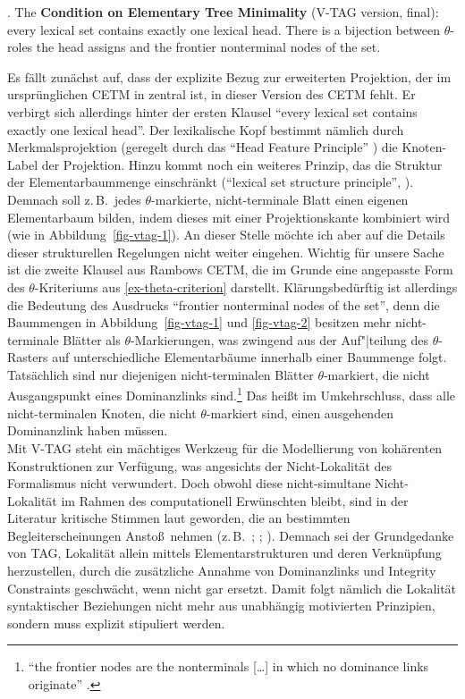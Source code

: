 \ex. The {\bf Condition on Elementary Tree Minimality} (V-TAG version, final): every lexical set contains exactly one lexical head. There is a bijection between $\theta$-roles the head assigns and the frontier nonterminal nodes of the set. \citep[149]{Rambow:94} \label{ex-vtag-cetm}

Es fällt zunächst auf, dass der explizite Bezug zur erweiterten Projektion, der im ursprünglichen CETM in \cite{Frank:92,Frank:02} zentral ist, in dieser Version des CETM fehlt. Er verbirgt sich allerdings hinter der ersten Klausel "`every lexical set contains exactly one lexical head"'. Der lexikalische Kopf bestimmt nämlich durch Merkmalsprojektion (geregelt durch das "`Head Feature Principle"' \citep[141f]{Rambow:94}) die Knoten-Label der Projektion. Hinzu kommt noch ein weiteres Prinzip, das die Struktur der Elementarbaummenge einschränkt ("`lexical set structure principle"', \citealt[149]{Rambow:94}). Demnach soll z.\,B.\ jedes $\theta$-markierte, nicht-terminale Blatt einen eigenen Elementarbaum bilden, indem dieses mit einer Projektionskante kombiniert wird (wie in Abbildung~\ref{fig-vtag-1}). An dieser Stelle möchte ich aber auf die Details dieser strukturellen Regelungen nicht weiter eingehen. Wichtig für unsere Sache ist die zweite Klausel aus Rambows CETM, die im Grunde eine angepasste Form des $\theta$-Kriteriums aus \ref{ex-theta-criterion} darstellt. Klärungsbedürftig ist allerdings die Bedeutung des Ausdrucks "`frontier nonterminal nodes of the set"', denn die Baummengen in Abbildung~\ref{fig-vtag-1} und \ref{fig-vtag-2} besitzen mehr nicht-terminale Blätter als $\theta$-Markierungen, was zwingend aus der Auf"|teilung des $\theta$-Rasters auf unterschiedliche Elementarbäume innerhalb einer Baummenge folgt. Tatsächlich sind nur diejenigen nicht-terminalen Blätter $\theta$-markiert, die nicht Ausgangspunkt eines Dominanzlinks sind.\footnote{"`the frontier nodes are the nonterminals [\ldots] in which no dominance links originate"' \cite[148,Fußnote~14]{Rambow:94}.} Das hei\ss t im Umkehrschluss, dass alle nicht-terminalen Knoten, die nicht $\theta$-markiert sind, einen ausgehenden Dominanzlink haben müssen. \\  

Mit V-TAG steht ein mächtiges Werkzeug für die Modellierung von kohärenten Konstruktionen zur Verfügung, was angesichts der Nicht-Lokalität des Formalismus nicht verwundert. Doch obwohl diese nicht-simultane Nicht-Lokalität im Rahmen des computationell Erwünschten bleibt, sind in der Literatur kritische Stimmen laut geworden, die an bestimmten Begleiterscheinungen Ansto\ss \ nehmen (z.\,B.\ \citealt[60]{Kulick:00}; \citealt[239]{Frank:02}; \citealt[191]{Kallmeyer:05}). Demnach sei der Grundgedanke von TAG, Lokalität allein mittels Elementarstrukturen und deren Verknüpfung herzustellen, durch die zusätzliche Annahme von Dominanzlinks und Integrity Constraints geschwächt, wenn nicht gar ersetzt. Damit folgt nämlich die Lokalität syntaktischer Beziehungen nicht mehr aus unabhängig motivierten Prinzipien, sondern muss explizit stipuliert werden.  


